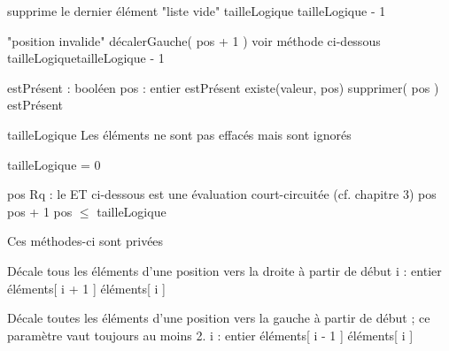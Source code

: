 \begin{Pseudocode}
		\LComment supprime le dernier élément
			\Error "liste vide"
		\EndIf
		\Let tailleLogique \Gets tailleLogique - 1
	\EndMethod
\end{Pseudocode}

\begin{Pseudocode}
			\Error "position invalide"
		\EndIf
		\Stmt décalerGauche( pos + 1 )
		\RComment voir méthode ci-dessous
		\Let tailleLogique\Gets tailleLogique - 1
	\EndMethod
\end{Pseudocode}

\begin{Pseudocode}
		\Decl estPrésent : booléen
		\Decl pos : entier
		\Let estPrésent \Gets existe(valeur, pos)
			\Stmt supprimer( pos )
		\EndIf
		\Return estPrésent
	\EndMethod
\end{Pseudocode}

\begin{Pseudocode}
		\Let tailleLogique  
		\RComment Les éléments ne sont pas effacés mais sont ignorés
	\EndMethod
\end{Pseudocode}

\begin{Pseudocode}
		\Return tailleLogique = 0
	\EndMethod
\end{Pseudocode}

\begin{Pseudocode}
		\Let pos 
		\LComment Rq : le ET ci-dessous est une évaluation 
		court-circuitée (cf. chapitre 3)
			\Let pos \Gets pos + 1
		\EndWhile
		\Return pos {${\leq}$} tailleLogique
	\EndMethod
\end{Pseudocode}

\begin{Pseudocode}
	\LComment Ces méthodes-ci sont privées
	\bigskip

		\LComment Décale tous les éléments d'une position vers
		la droite à partir de début
		\Decl i : entier
			\Let éléments[ i + 1 ] \Gets éléments[ i ]
		\EndFor
	\EndMethod

	\bigskip
	
		\LComment Décale toutes les éléments d'une position vers
		la gauche à partir de début ; 
		\LComment ce paramètre vaut toujours au moins 2.
		\Decl i : entier
			\Let éléments[ i - 1 ] \Gets éléments[ i ]
		\EndFor
	\EndMethod
\end{Pseudocode}

